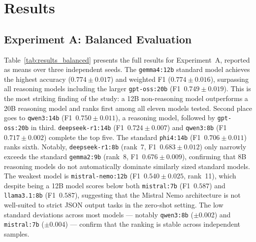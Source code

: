 \documentclass[a4paper,fleqn]{cas-dc}
\begin{document}
\section{Results}
\label{sec:results}

\subsection{Experiment A: Balanced Evaluation}

Table~\ref{tab:results_balanced} presents the full results for
Experiment~A, reported as means over three independent seeds.
The \texttt{gemma4:12b} standard model achieves the
highest accuracy ($0.774 \pm 0.017$) and weighted F1 ($0.774 \pm 0.016$),
surpassing all reasoning models including the larger
\texttt{gpt-oss:20b} (F1~$0.749 \pm 0.019$). This is the most striking
finding of the study: a 12B non-reasoning model outperforms a 20B
reasoning model and ranks first among all eleven models tested.
Second place goes to \texttt{qwen3:14b} (F1~$0.750 \pm 0.011$),
a reasoning model, followed by \texttt{gpt-oss:20b} in third.
\texttt{deepseek-r1:14b} (F1~$0.724 \pm 0.007$) and
\texttt{qwen3:8b} (F1~$0.717 \pm 0.002$) complete the top five.
The standard \texttt{phi4:14b} (F1~$0.706 \pm 0.011$) ranks sixth.
Notably, \texttt{deepseek-r1:8b} (rank~7, F1~$0.683 \pm 0.012$)
only narrowly exceeds the standard \texttt{gemma2:9b} (rank~8,
F1~$0.676 \pm 0.009$), confirming that 8B reasoning models do not
automatically dominate similarly sized standard models. The weakest model is \texttt{mistral-nemo:12b}
(F1~$0.540 \pm 0.025$, rank~11), which despite being a 12B model
scores below both \texttt{mistral:7b} (F1~$0.587$) and
\texttt{llama3.1:8b} (F1~$0.587$), suggesting that the Mistral Nemo
architecture is not well-suited to strict JSON output tasks in the
zero-shot setting. The low standard deviations across most models ---
notably \texttt{qwen3:8b} ($\pm$0.002) and \texttt{mistral:7b}
($\pm$0.004) --- confirm that the ranking is stable across independent
samples.
\end{document}
